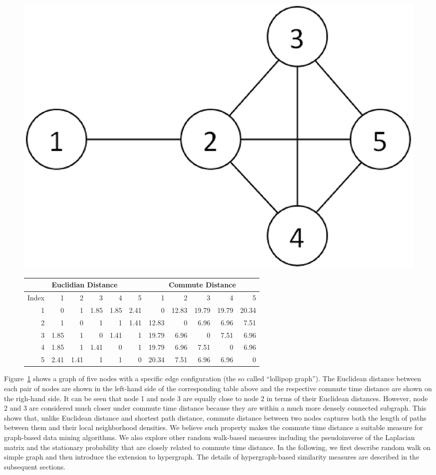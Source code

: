 \begin{figure}[tbh]
\centering
\begin{minipage}[c]{\textwidth}\centering
\includegraphics[width=.4\textwidth]{fig/comm-dist-demo.eps}
\end{minipage}
\hfill
\begin{minipage}[c]{\textwidth}\centering
\begin{tabular}{r|r|r|r|r|r || r|r|r|r|r}
\hline\hline
\multicolumn{6}{c||}{Euclidian Distance}	&	\multicolumn{5}{c}{Commute Distance}		\\
\hline\hline							
Index	&	1	&	2	&	3	&	4	&	5	&	1	&	2	&	3	&	4	&	5	\\
\hline
1	&	0	&	1	&	1.85	&	1.85	&	2.41	&	0	&	12.83	&	19.79	&	19.79	&	20.34	\\
\hline
2	&	1	&	0	&	1	&	1	&	1.41	&	12.83	&	0	&	6.96	&	6.96	&	7.51	\\
\hline
3	&	1.85	&	1	&	0	&	1.41	&	1	&	19.79	&	6.96	&	0	&	7.51	&	6.96	\\
\hline
4	&	1.85	&	1	&	1.41	&	0	&	1	&	19.79	&	6.96	&	7.51	&	0	&	6.96	\\
\hline
5	&	2.41	&	1.41	&	1	&	1	&	0	&	20.34	&	7.51	&	6.96	&	6.96	&	0	\\
\hline\hline
\end{tabular}
\end{minipage}
\caption{\label{fig:cd-demo}}
\end{figure}

Figure~\ref{fig:cd-demo} shows a graph of five nodes with a specific edge configuration (the so called ``lollipop graph''). The Euclidean distance between each pair of nodes are shown in the left-hand side of the corresponding table above and the respective commute time distance are shown on the righ-hand side. It can be seen that node 1 and node 3 are equally close to node 2 in terms of their Euclidean distances. However, node 2 and 3 are considered much closer under commute time distance because they are within a much more densely connected subgraph. This shows that, unlike Euclidean distance and shortest path distance, commute distance between two nodes captures both the length of paths between them and their local neighborhood densities. We believe such property makes the commute time distance a suitable measure for graph-based data mining algorithms. We also explore other random walk-based measures including the pseudoinverse of the Laplacian matrix and the stationary probability that are closely related to commute time distance. In the following, we first describe random walk on simple graph and then introduce the extension to hypergraph. The details of hypergraph-based similarity measures are described in the subsequent sections. 

